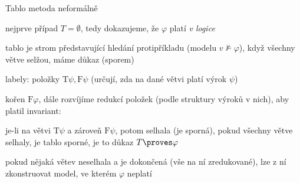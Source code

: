\documentclass{beamer}
\begin{document}
\begin{frame}{Tablo metoda neformálně}

    nejprve případ $T=\emptyset$, tedy dokazujeme, že $\varphi$ platí \emph{v logice}

    \pause
    \alert{tablo} je strom představující \alert{hledání protipříkladu} (modelu $v\not\models\varphi$), \pause když všechny větve \alert{selžou}, máme důkaz (sporem)

    \pause
    labely: \alert{položky} $\mathrm{T}\psi,\mathrm{F}\psi$ (určují, zda na dané větvi platí výrok $\psi$)

    \pause
    kořen \alert{$\mathrm{F}\varphi$}, dále rozvíjíme \alert{redukcí} položek (podle struktury výroků v nich), aby platil \alert{invariant}:

    \pause

    \pause
    je-li na větvi \alert{$\mathrm{T}\psi$} a zároveň \alert{$\mathrm{F}\psi$}, potom \alert{selhala} (je \alert{sporná}), pokud všechny větve selhaly, je tablo \alert{sporné}, je to \alert{důkaz} $T\proves\varphi$

    \pause
    pokud nějaká větev neselhala a je \alert{dokončená} (vše na ní zredukované), lze z ní zkonstruovat model, ve kterém $\varphi$ neplatí

\end{frame}
\end{document}
